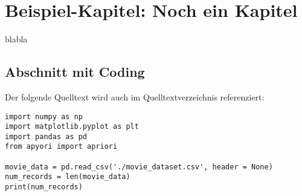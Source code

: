 \chapter{Beispiel-Kapitel: Noch ein Kapitel}

blabla

\section{Abschnitt mit Coding}

Der folgende Quelltext wird auch im Quelltextverzeichnis referenziert:

\begin{lstlisting}[caption={\texttt{PrintMovieDB.py}},captionpos=b]
import numpy as np  
import matplotlib.pyplot as plt  
import pandas as pd  
from apyori import apriori

movie_data = pd.read_csv('./movie_dataset.csv', header = None)
num_records = len(movie_data)
print(num_records)
\end{lstlisting}
